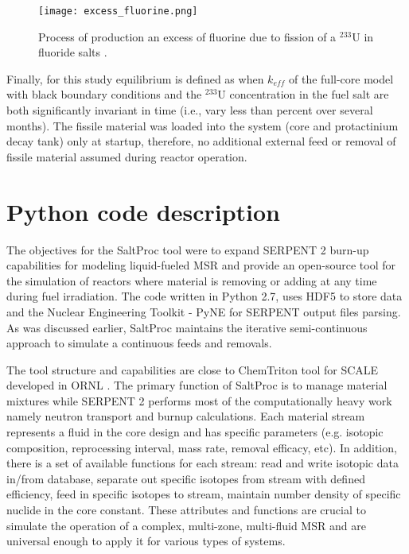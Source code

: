 \begin{figure}[htp!] %
  \centering
  \vspace{-0.3em}
  \texttt{[image: excess\_fluorine.png]}
  \caption{Process of production an excess of fluorine due to fission of a $^{233}$U in fluoride salts \cite{ridley_method_2017}.}
  \vspace{-0.6em}
  \label{fig:excess_fluorine}
\end{figure}
\FloatBarrier

Finally, for this study equilibrium is defined as when $k_{eff}$ of the full-core model with black boundary conditions and the $^{233}$U concentration in the fuel salt are both significantly invariant in time (i.e., vary less than percent over several months). The fissile material was loaded into the system (core and protactinium decay tank) only at startup, therefore, no additional external feed or removal of fissile material assumed during reactor operation.

\section{Python code description}
The objectives for the SaltProc tool were to expand SERPENT 2 burn-up capabilities for modeling liquid-fueled \gls{MSR} and provide an open-source tool for the simulation of reactors where material is removing or adding at any time during fuel irradiation. The code written in Python 2.7, uses HDF5 \cite{the_hdf_group_hierarchical_nodate} to store data and the Nuclear Engineering Toolkit - PyNE \cite{scopatz_pyne:_2012} for SERPENT output files parsing. As was discussed earlier, SaltProc maintains the iterative semi-continuous approach to simulate a continuous feeds and removals.

The tool structure and capabilities are close to ChemTriton tool for SCALE developed in \gls{ORNL} \cite{powers_new_2013}. The primary function of SaltProc is to manage material mixtures while SERPENT 2 performs most of the computationally heavy work namely neutron transport and burnup calculations. Each material stream represents a fluid in the core design and has specific parameters (e.g. isotopic composition, reprocessing interval, mass rate, removal efficacy, etc). In addition, there is a set of available functions for each stream: read and write isotopic data in/from database, separate out specific isotopes from stream with defined efficiency, feed in specific isotopes to stream, maintain number density of specific nuclide in the core constant. These attributes and functions are crucial to simulate the operation of a complex, multi-zone, multi-fluid \gls{MSR} and are universal enough to apply it for various types of systems.

